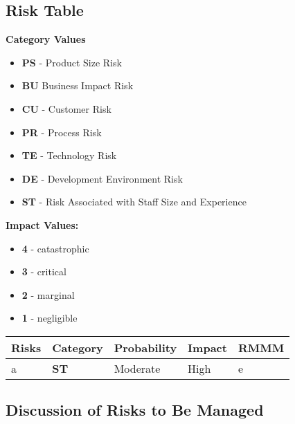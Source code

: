 \documentclass[english,12pt]{article}
\begin{document}
\subsection{Risk Table}
\begin{varwidth}[t]{.4\textwidth}
  \textbf{Category Values}
  \begin{itemize}
    \item \textbf{PS} - Product Size Risk
    \item \textbf{BU} Business Impact Risk
    \item \textbf{CU} - Customer Risk
    \item \textbf{PR} - Process Risk
    \item \textbf{TE} - Technology Risk 
    \item \textbf{DE} - Development Environment Risk
    \item \textbf{ST} - Risk Associated with Staff Size and Experience 
  \end{itemize}
  \end{varwidth}
  \hspace{4em}
  \begin{varwidth}[t]{.5\textwidth}
  \textbf{Impact Values:}
  \begin{itemize}
    \item \textbf{4} - catastrophic
    \item \textbf{3} - critical
    \item \textbf{2} - marginal
    \item \textbf{1} - negligible
  \end{itemize}
\end{varwidth}

\begin{table}[H]
  \begin{center}
    \begin{tabular}[c]{|l|l|l|l|l|}
      \hline
      \multicolumn{1}{|c|}{\textbf{Risks}} & 
      \multicolumn{1}{|c|}{\textbf{Category}} & 
      \multicolumn{1}{|c|}{\textbf{Probability}} &
      \multicolumn{1}{|c|}{\textbf{Impact}} &
      \multicolumn{1}{|c|}{\textbf{RMMM}} \\ [0.5ex]
      \hline\hline
      a & \textbf{ST} & Moderate & High & e\\
      \hline
    \end{tabular}
  \end{center}
\end{table}

\subsection{Discussion of Risks to Be Managed}
\end{document}
